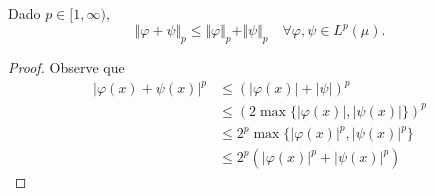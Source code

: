\documentclass{article}
\theoremstyle{definition}
\numberwithin{equation}{section}
\begin{document}
	\begin{thm}
		Dado $p\in[1,\infty)$,
		\[\Vert \varphi+\psi\Vert_p\leq\Vert\varphi\Vert_p+\Vert\psi\Vert_p\quad\forall\varphi,\psi\in L^p(\mu).\]
	\end{thm}
	\begin{proof}
		Observe que
		\begin{align*}
			|\varphi(x)+\psi(x)|^p&\leq (|\varphi(x)|+|\psi|)^p\\
			&\leq(2\max\{|\varphi(x)|,|\psi(x)|\})^p\\
			&\leq 2^p\max\{|\varphi(x)|^p,|\psi(x)|^p\}\\
			&\leq2^p(|\varphi(x)|^p+|\psi(x)|^p)
		\end{align*}
		

	\end{proof}
	
	\iffalse
	\clearpage
\end{document}
